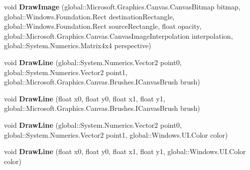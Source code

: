 \begin{DoxyCompactItemize}
\item 
\mbox{\label{interface_microsoft_1_1_graphics_1_1_canvas_1_1_i_canvas_drawing_session_a7a0435e8e3e350ce01e58979f448a53d}} 
void {\bfseries Draw\+Image} (global\+::\+Microsoft.\+Graphics.\+Canvas.\+Canvas\+Bitmap bitmap, global\+::\+Windows.\+Foundation.\+Rect destination\+Rectangle, global\+::\+Windows.\+Foundation.\+Rect source\+Rectangle, float opacity, global\+::\+Microsoft.\+Graphics.\+Canvas.\+Canvas\+Image\+Interpolation interpolation, global\+::\+System.\+Numerics.\+Matrix4x4 perspective)
\item 
\mbox{\label{interface_microsoft_1_1_graphics_1_1_canvas_1_1_i_canvas_drawing_session_a5873fbca4b82b0953078150102fb9000}} 
void {\bfseries Draw\+Line} (global\+::\+System.\+Numerics.\+Vector2 point0, global\+::\+System.\+Numerics.\+Vector2 point1, global\+::\+Microsoft.\+Graphics.\+Canvas.\+Brushes.\+I\+Canvas\+Brush brush)
\item 
\mbox{\label{interface_microsoft_1_1_graphics_1_1_canvas_1_1_i_canvas_drawing_session_acf7fd73b7fc5a481b09e3ea4d14d4d59}} 
void {\bfseries Draw\+Line} (float x0, float y0, float x1, float y1, global\+::\+Microsoft.\+Graphics.\+Canvas.\+Brushes.\+I\+Canvas\+Brush brush)
\item 
\mbox{\label{interface_microsoft_1_1_graphics_1_1_canvas_1_1_i_canvas_drawing_session_a1c018d3317970310c6e9cdb533cae0c6}} 
void {\bfseries Draw\+Line} (global\+::\+System.\+Numerics.\+Vector2 point0, global\+::\+System.\+Numerics.\+Vector2 point1, global\+::\+Windows.\+U\+I.\+Color color)
\item 
\mbox{\label{interface_microsoft_1_1_graphics_1_1_canvas_1_1_i_canvas_drawing_session_a0c0cbe814b2c9574addc8f75b90e3cdf}} 
void {\bfseries Draw\+Line} (float x0, float y0, float x1, float y1, global\+::\+Windows.\+U\+I.\+Color color)
\item 
\mbox{\label{interface_microsoft_1_1_graphics_1_1_canvas_1_1_i_canvas_drawing_session_a9abdb1e2da9c7671f75ce437d7bcba48}} 

\end{DoxyCompactItemize}
